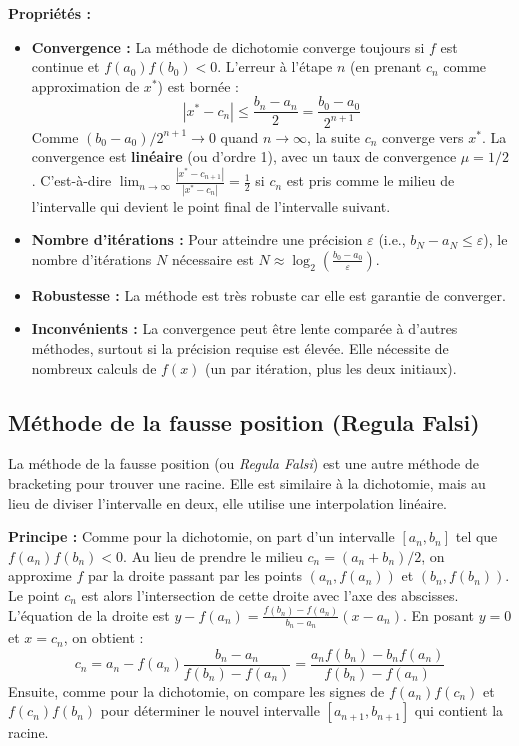 \textbf{Propriétés :}
\begin{itemize}
    \item \textbf{Convergence :} La méthode de dichotomie converge toujours si $f$ est continue et $f(a_0)f(b_0)<0$. L'erreur à l'étape $n$ (en prenant $c_n$ comme approximation de $x^*$) est bornée :
    \[ |x^* - c_n| \le \frac{b_n - a_n}{2} = \frac{b_0 - a_0}{2^{n+1}} \]
    Comme $(b_0-a_0)/2^{n+1} \to 0$ quand $n \to \infty$, la suite $c_n$ converge vers $x^*$.
    La convergence est \textbf{linéaire} (ou d'ordre 1), avec un taux de convergence $\mu = 1/2$. C'est-à-dire $\lim_{n\to\infty} \frac{|x^* - c_{n+1}|}{|x^* - c_n|} = \frac{1}{2}$ si $c_n$ est pris comme le milieu de l'intervalle qui devient le point final de l'intervalle suivant.
    \item \textbf{Nombre d'itérations :} Pour atteindre une précision $\varepsilon$ (i.e., $b_N-a_N \le \varepsilon$), le nombre d'itérations $N$ nécessaire est $N \approx \log_2\left(\frac{b_0-a_0}{\varepsilon}\right)$.
    \item \textbf{Robustesse :} La méthode est très robuste car elle est garantie de converger.
    \item \textbf{Inconvénients :} La convergence peut être lente comparée à d'autres méthodes, surtout si la précision requise est élevée. Elle nécessite de nombreux calculs de $f(x)$ (un par itération, plus les deux initiaux).
\end{itemize}


\subsection{Méthode de la fausse position (Regula Falsi)}
La méthode de la fausse position (ou \textit{Regula Falsi}) est une autre méthode de bracketing pour trouver une racine. Elle est similaire à la dichotomie, mais au lieu de diviser l'intervalle en deux, elle utilise une interpolation linéaire.

\textbf{Principe :}
Comme pour la dichotomie, on part d'un intervalle $[a_n, b_n]$ tel que $f(a_n)f(b_n) < 0$.
Au lieu de prendre le milieu $c_n = (a_n+b_n)/2$, on approxime $f$ par la droite passant par les points $(a_n, f(a_n))$ et $(b_n, f(b_n))$. Le point $c_n$ est alors l'intersection de cette droite avec l'axe des abscisses.
L'équation de la droite est $y - f(a_n) = \frac{f(b_n)-f(a_n)}{b_n-a_n}(x-a_n)$.
En posant $y=0$ et $x=c_n$, on obtient :
\[ c_n = a_n - f(a_n) \frac{b_n-a_n}{f(b_n)-f(a_n)} = \frac{a_n f(b_n) - b_n f(a_n)}{f(b_n) - f(a_n)} \]
Ensuite, comme pour la dichotomie, on compare les signes de $f(a_n)f(c_n)$ et $f(c_n)f(b_n)$ pour déterminer le nouvel intervalle $[a_{n+1}, b_{n+1}]$ qui contient la racine.

